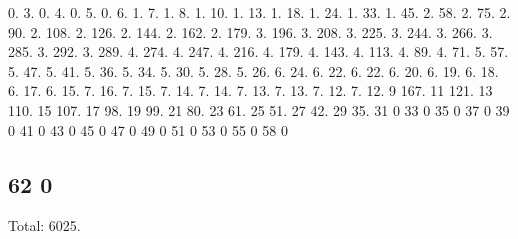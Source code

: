 0. 3. 0. 4. 0. 5. 0. 6. 1. 7. 1. 8. 1. 10. 1. 13. 1. 18. 1. 24. 1. 33. 1. 45. 2. 58. 2. 75. 2. 90. 2. 108. 2. 126. 2. 144. 2. 162. 2. 179. 3. 196. 3. 208. 3. 225. 3. 244. 3. 266. 3. 285. 3. 292. 3. 289. 4. 274. 4. 247. 4. 216. 4. 179. 4. 143. 4. 113. 4. 89. 4. 71. 5. 57. 5. 47. 5. 41. 5. 36. 5. 34. 5. 30. 5. 28. 5. 26. 6. 24. 6. 22. 6. 22. 6. 20. 6. 19. 6. 18. 6. 17. 6. 15. 7. 16. 7. 15. 7. 14. 7. 14. 7. 13. 7. 13. 7. 12. 7. 12. 9 167. 11 121. 13 110. 15 107. 17 98. 19 99. 21 80. 23 61. 25 51. 27 42. 29 35. 31 0 33 0 35 0 37 0 39 0 41 0 43 0 45 0 47 0 49 0 51 0 53 0 55 0 58 0 \subsection*{62 0 }

Total\+: 6025. 